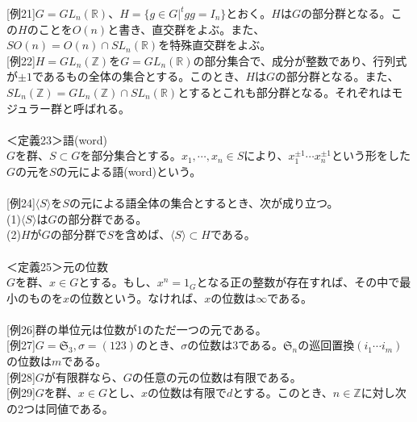 \documentclass{jsarticle}
\begin{document}
\hspace{5mm}[例21]\(G=GL_{n}(\mathbb{R})\)、\(H=\{g\in G|^{t}gg=I_{n}\}\)とおく。\(H\)は\(G\)の部分群となる。この\(H\)のことを\(O(n)\)と書き、直交群をよぶ。また、\(SO(n)=O(n)\cap SL_{n}(\mathbb{R})\)を特殊直交群をよぶ。\\
\hspace{5mm}[例22]\(H=GL_{n}(\mathbb{Z})\)を\(G=GL_{n}(\mathbb{R})\)の部分集合で、成分が整数であり、行列式が\(\pm1\)であるもの全体の集合とする。このとき、\(H\)は\(G\)の部分群となる。また、\(SL_{n}(\mathbb{Z})=GL_{n}(\mathbb{Z})\cap SL_{n}(\mathbb{R})\)とするとこれも部分群となる。それぞれはモジュラー群と呼ばれる。\\
\\
＜定義23＞語(word)\\
\(G\)を群、\(S\subset G\)を部分集合とする。\(x_{1},\cdots,x_{n}\in S\)により、\(x_{1}^{\pm1}\cdots x_{n}^{\pm1}\)という形をした\(G\)の元を\(S\)の元による語(word)という。\\
\\
\hspace{5mm}[例24]\(\langle S\rangle\)を\(S\)の元による語全体の集合とするとき、次が成り立つ。\\
\hspace{5mm}(1)\(\langle S\rangle\)は\(G\)の部分群である。\\
\hspace{5mm}(2)\(H\)が\(G\)の部分群で\(S\)を含めば、\(\langle S\rangle\subset H\)である。\\
\\
＜定義25＞元の位数\\
\(G\)を群、\(x\in G\)とする。もし、\(x^{n}=1_{G}\)となる正の整数が存在すれば、その中で最小のものを\(x\)の位数という。なければ、\(x\)の位数は\(\infty\)である。\\
\\
\hspace{5mm}[例26]群の単位元は位数が1のただ一つの元である。\\
\hspace{5mm}[例27]\(G=\mathfrak{S}_{3},\sigma=(123)\)のとき、\(\sigma\)の位数は3である。\(\mathfrak{S}_{n}\)の巡回置換\((i_{1}\cdots i_{m})\)の位数は\(m\)である。\\
\hspace{5mm}[例28]\(G\)が有限群なら、\(G\)の任意の元の位数は有限である。\\
\hspace{5mm}[例29]\(G\)を群、\(x\in G\)とし、\(x\)の位数は有限で\(d\)とする。このとき、\(n\in\mathbb{Z}\)に対し次の2つは同値である。\\
\end{document}

